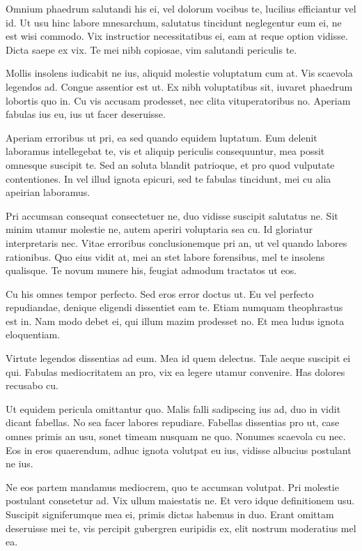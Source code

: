\documentclass[10pt,a4paper]{report}
\begin{document}
    \sffamily
    Omnium phaedrum salutandi his ei, vel dolorum vocibus te, lucilius efficiantur vel id. Ut usu hinc labore mnesarchum, salutatus tincidunt neglegentur eum ei, ne est wisi commodo. Vix instructior necessitatibus ei, eam at reque option vidisse. Dicta saepe ex vix. Te mei nibh copiosae, vim salutandi periculis te.
    
    Mollis insolens iudicabit ne ius, aliquid molestie voluptatum cum at. Vis scaevola legendos ad. Congue assentior est ut. Ex nibh voluptatibus sit, iuvaret phaedrum lobortis quo in. Cu vis accusam prodesset, nec clita vituperatoribus no. Aperiam fabulas ius eu, ius ut facer deseruisse.
    
    Aperiam erroribus ut pri, ea sed quando equidem luptatum. Eum delenit laboramus intellegebat te, vis et aliquip periculis consequuntur, mea possit omnesque suscipit te. Sed an soluta blandit patrioque, et pro quod vulputate contentiones. In vel illud ignota epicuri, sed te fabulas tincidunt, mei cu alia apeirian laboramus.
    
    Pri accumsan consequat consectetuer ne, duo vidisse suscipit salutatus ne. Sit minim utamur molestie ne, autem aperiri voluptaria sea cu. Id gloriatur interpretaris nec. Vitae erroribus conclusionemque pri an, ut vel quando labores rationibus. Quo eius vidit at, mei an stet labore forensibus, mel te insolens qualisque. Te novum munere his, feugiat admodum tractatos ut eos.
    
    Cu his omnes tempor perfecto. Sed eros error doctus ut. Eu vel perfecto repudiandae, denique eligendi dissentiet eam te. Etiam numquam theophrastus est in. Nam modo debet ei, qui illum mazim prodesset no. Et mea ludus ignota eloquentiam.
    
    Virtute legendos dissentias ad eum. Mea id quem delectus. Tale aeque suscipit ei qui. Fabulas mediocritatem an pro, vix ea legere utamur convenire. Has dolores recusabo cu.
    
    Ut equidem pericula omittantur quo. Malis falli sadipscing ius ad, duo in vidit dicant fabellas. No sea facer labores repudiare. Fabellas dissentias pro ut, case omnes primis an usu, sonet timeam nusquam ne quo. Nonumes scaevola cu nec. Eos in eros quaerendum, adhuc ignota volutpat eu ius, vidisse albucius postulant ne ius.
    
    Ne eos partem mandamus mediocrem, quo te accumsan volutpat. Pri molestie postulant consetetur ad. Vix ullum maiestatis ne. Et vero idque definitionem usu. Suscipit signiferumque mea ei, primis dictas habemus in duo. Erant omittam deseruisse mei te, vis percipit gubergren euripidis ex, elit nostrum moderatius mel ea.
    
\end{document}
